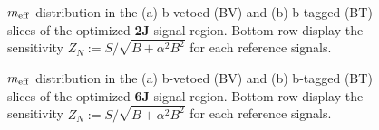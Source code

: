 \clearpage
\begin{figure}[h]
  \centering
    \caption{
     $m_{\mathrm{eff}}$ distribution in the (a) b-vetoed (BV) and (b) b-tagged (BT) slices of the optimized \textbf{2J} signal region. Bottom row display the sensitivity $Z_N := S/\sqrt{B+\alpha^2 B^2}$ for each reference signals.
    \label{fig::SRdefinition::SRmeffInc2J}}
\end{figure}

\begin{figure}[h]
  \centering
    \caption{ 
     $m_{\mathrm{eff}}$ distribution in the (a) b-vetoed (BV) and (b) b-tagged (BT) slices of the optimized \textbf{6J} signal region. Bottom row display the sensitivity $Z_N := S/\sqrt{B+\alpha^2 B^2}$ for each reference signals.
    \label{fig::SRdefinition::SRmeffInc6J} }
\end{figure}

